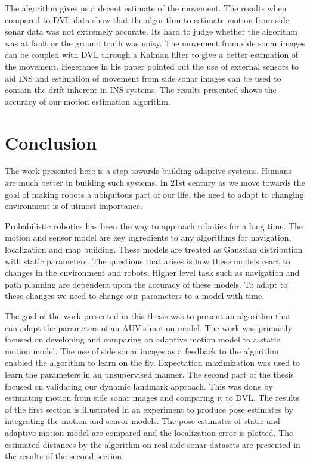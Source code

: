 \documentclass[12pt]{dalcsthesis}
\begin{document}
The algorithm gives us a decent estimate of the movement. The results when compared to DVL data show that the algorithm to estimate motion from side sonar data was not extremely accurate. Its hard to judge whether the algorithm was at fault or the ground truth was noisy. The movement from side sonar images can be coupled with DVL through a Kalman filter to give a better estimation of the movement. Hegeranes \cite{Hegrenæs2008} in his paper pointed out the use of external sensors to aid INS and estimation of movement from side sonar images can be used to contain the drift inherent in INS systems. 
The results presented shows the accuracy of our motion estimation algorithm.
\chapter{Conclusion}
The work presented here is a step towards building adaptive systems. Humans are much better in building such systems. In 21st century as we move towards the goal of making robots a ubiquitous part of our life, the need to adapt to changing environment is of utmost importance. 

Probabilistic robotics has been the way to approach robotics for a long time. The motion and sensor model are key ingredients to any algorithms for navigation, localization and map building. These models are treated as Gaussian distribution with static parameters. The questions that arises is how these models react to changes in the environment and robots. Higher level task such as navigation and path planning are dependent upon the accuracy of these models. To adapt to these changes we need to change our parameters to a model with time.

The goal of the work presented in this thesis was to present an algorithm that can adapt the parameters of an AUV's motion model. The work was primarily focused on developing and comparing an adaptive motion model to a static motion model. The use of side sonar images as a feedback to the algorithm enabled the algorithm to learn on the fly. Expectation maximization was used to learn the parameters in an unsupervised manner. The second part of the thesis focused on validating our dynamic landmark approach. This was done by estimating motion from side sonar images and comparing it to DVL. The results of the first section is illustrated in an experiment to produce pose estimates by integrating the motion and sensor models. The pose estimates of static and adaptive motion model are compared and the localization error is plotted. The estimated distances by the algorithm on real side sonar datasets are presented in the results of the second section.
\end{document}
